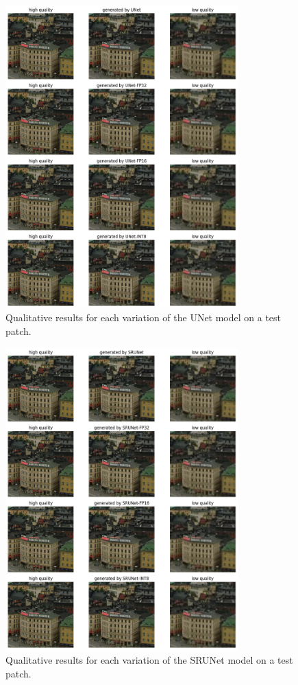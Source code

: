 \begin{figure}[ht]
\includegraphics[width=0.8\textwidth]{static/unet_qualitative_results.png}
\caption{Qualitative results for each variation of the UNet model on a test patch.}
\label{fig:qualitative-unet}
\end{figure}

\begin{figure}[ht]
\includegraphics[width=0.8\textwidth]{static/srunet_qualitative_results.png}
\caption{Qualitative results for each variation of the SRUNet model on a test patch.}
\label{fig:qualitative-srunet}
\end{figure}
